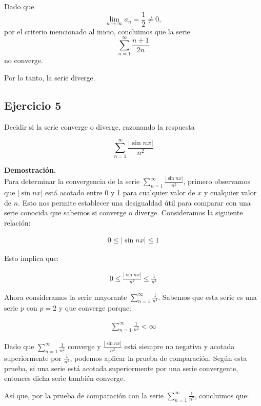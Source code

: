 \documentclass{article}
\begin{document}
    Dado que
    \[
    \lim _{n \rightarrow \infty} a_{n} = \frac{1}{2} \neq 0,
    \]
    por el criterio mencionado al inicio, concluimos que la serie
    \[
    \sum_{n=1}^{\infty} \frac{n+1}{2 n}
    \]
    no converge.

    Por lo tanto, la serie diverge.

    \subsection*{Ejercicio 5}

    Decidir si la serie converge o diverge, razonando la respuesta

    $$
    \sum_{n=1}^{\infty} \frac{|\sin n x|}{n^{2}}
    $$

        \textbf{Demostración}.\\

    Para determinar la convergencia de la serie $\sum_{n=1}^{\infty} \frac{|\sin n x|}{n^{2}}$, primero observamos que $|\sin n x|$ está acotado entre 0 y 1 para cualquier valor de $x$ y cualquier valor de $n$. Esto nos permite establecer una desigualdad útil para comparar con una serie conocida que sabemos si converge o diverge. Consideramos la siguiente relación:

    \begin{align*}
    0 \leq |\sin n x| \leq 1
    \end{align*}

    Esto implica que:

    \begin{align*}
    0 \leq \frac{|\sin n x|}{n^{2}} \leq \frac{1}{n^{2}}
    \end{align*}

    Ahora consideramos la serie mayorante $\sum_{n=1}^{\infty} \frac{1}{n^{2}}$. Sabemos que esta serie es una serie $p$ con $p = 2$ y que converge porque:

    \begin{align*}
    \sum_{n=1}^{\infty} \frac{1}{n^{2}} < \infty
    \end{align*}

    Dado que $\sum_{n=1}^{\infty} \frac{1}{n^{2}}$ converge y $\frac{|\sin n x|}{n^{2}}$ está siempre no negativa y acotada superiormente por $\frac{1}{n^{2}}$, podemos aplicar la prueba de comparación. Según esta prueba, si una serie está acotada superiormente por una serie convergente, entonces dicha serie también converge.

    Así que, por la prueba de comparación con la serie $\sum_{n=1}^{\infty} \frac{1}{n^{2}}$, concluimos que:
\end{document}
